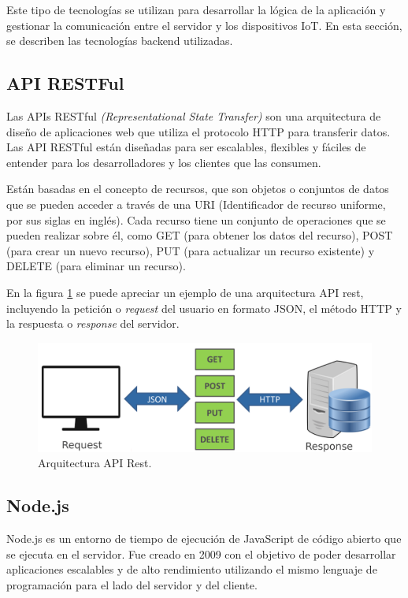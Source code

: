 Este tipo de tecnologías se utilizan para desarrollar la lógica de la aplicación y gestionar la comunicación entre el servidor y los dispositivos IoT. En esta sección, se describen las tecnologías backend utilizadas.

\subsection{API RESTFul}
\label{subsec:apis}

Las APIs RESTful \cite{fielding_architectural_2000} \textit{(Representational State Transfer)} son una arquitectura de diseño de aplicaciones web que utiliza el protocolo HTTP para transferir datos. Las API RESTful están diseñadas para ser escalables, flexibles y fáciles de entender para los desarrolladores y los clientes que las consumen.

Están basadas en el concepto de recursos, que son objetos o conjuntos de datos que se pueden acceder a través de una URI (Identificador de recurso uniforme, por sus siglas en inglés). Cada recurso tiene un conjunto de operaciones que se pueden realizar sobre él, como GET (para obtener los datos del recurso), POST (para crear un nuevo recurso), PUT (para actualizar un recurso existente) y DELETE (para eliminar un recurso).

En la figura \ref{fig:apirest} se puede apreciar un ejemplo de una arquitectura API rest, incluyendo la petición o \textit{request} del usuario en formato JSON, el método HTTP y la respuesta o \textit{response} del servidor.

\begin{figure}[ht]
	\centering
	\includegraphics[scale=.15]{./Figures/apirest.png}
	\caption{Arquitectura API Rest.}
	\label{fig:apirest}
\end{figure}

\subsection{Node.js}
\label{subsec:nodejs}

Node.js \cite{WEBSITE:nodejs} es un entorno de tiempo de ejecución de JavaScript de código abierto que se ejecuta en el servidor. Fue creado en 2009 con el objetivo de poder desarrollar aplicaciones escalables y de alto rendimiento utilizando el mismo lenguaje de programación para el lado del servidor y del cliente.

